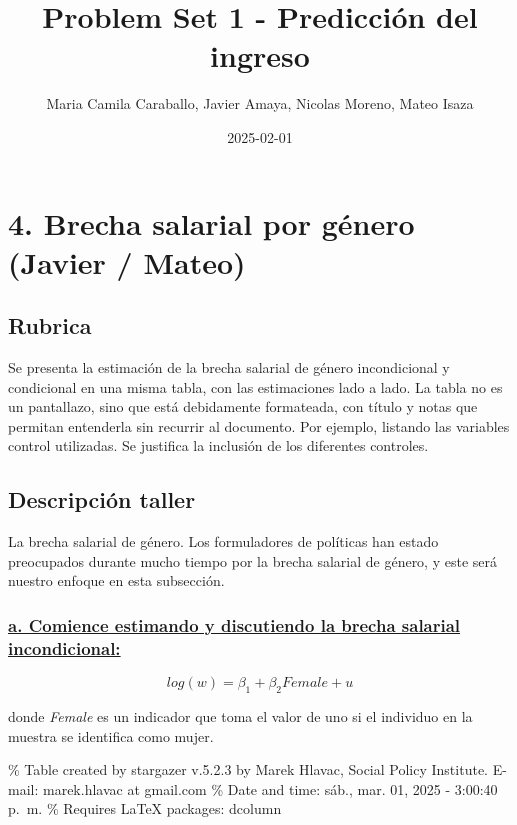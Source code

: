 \documentclass[
]{article}
\title{Problem Set 1 - Predicción del ingreso}
\author{Maria Camila Caraballo, Javier Amaya, Nicolas Moreno, Mateo
Isaza}
\date{2025-02-01}
\begin{document}
\maketitle

{
\setcounter{tocdepth}{2}
\tableofcontents
}
\newpage{}

\section{4. Brecha salarial por género (Javier /
Mateo)}\label{brecha-salarial-por-guxe9nero-javier-mateo}

\subsection{Rubrica}\label{rubrica}

Se presenta la estimación de la brecha salarial de género incondicional
y condicional en una misma tabla, con las estimaciones lado a lado. La
tabla no es un pantallazo, sino que está debidamente formateada, con
título y notas que permitan entenderla sin recurrir al documento. Por
ejemplo, listando las variables control utilizadas. Se justifica la
inclusión de los diferentes controles.

\subsection{Descripción taller}\label{descripciuxf3n-taller}

La brecha salarial de género. Los formuladores de políticas han estado
preocupados durante mucho tiempo por la brecha salarial de género, y
este será nuestro enfoque en esta subsección.

\subsubsection{\texorpdfstring{\ul{a. Comience estimando y discutiendo
la brecha salarial
incondicional:}}{a. Comience estimando y discutiendo la brecha salarial incondicional:}}\label{a.-comience-estimando-y-discutiendo-la-brecha-salarial-incondicional}

\[
log(w) = \beta_1 + \beta_2Female + u
\]

donde \emph{Female} es un indicador que toma el valor de uno si el
individuo en la muestra se identifica como mujer.

\% Table created by stargazer v.5.2.3 by Marek Hlavac, Social Policy
Institute. E-mail: marek.hlavac at gmail.com \% Date and time: sáb.,
mar. 01, 2025 - 3:00:40 p.~m. \% Requires LaTeX packages: dcolumn
\end{document}
